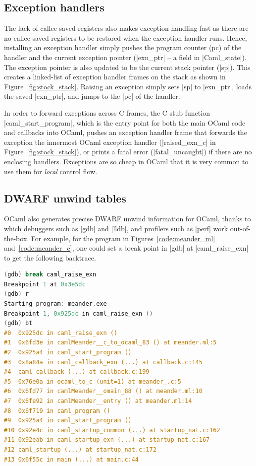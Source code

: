 \documentclass[sigplan,10pt,review,anonymous]{acmart}\settopmatter{printfolios=true,printccs=false,printacmref=false}
\begin{document}
\subsection{Exception handlers}

The lack of callee-saved registers also makes exception handling fast as there
are no callee-saved registers to be restored when the exception handler runs.
Hence, installing an exception handler simply pushes the program counter (pc)
of the handler and the current exception pointer (|exn_ptr| -- a field in
|Caml_state|). The exception pointer is also updated to be the current stack
pointer (|sp|). This creates a linked-list of exception handler frames on the
stack as shown in Figure~\ref{fig:stock_stack}. Raising an exception simply
sets |sp| to |exn_ptr|, loads the saved |exn_ptr|, and jumps to the |pc| of the
handler.

In order to forward exceptions across C frames, the C stub function
|caml_start_program|, which is the entry point for both the main OCaml code and
callbacks into OCaml, pushes an exception handler frame that forwards the
exception the innermost OCaml exception handler (|raised_exn_c| in
Figure~\ref{fig:stock_stack}), or prints a fatal error (|fatal_uncaught|) if
there are no enclosing handlers. Exceptions are so cheap in OCaml that it is
very common to use them for \emph{local} control flow.

\subsection{DWARF unwind tables}

OCaml also generates precise DWARF unwind information for OCaml, thanks to
which debuggers such as |gdb| and |lldb|, and profilers such as |perf| work
out-of-the-box. For example, for the program in Figures~\ref{code:meander_ml}
and~\ref{code:meander_c}, one could set a break point in |gdb| at
|caml_raise_exn| to get the following backtrace.

\begin{lstlisting}[language=c,basicstyle=\ttfamily\footnotesize]
% gdb ./meander.exe
(gdb) break caml_raise_exn
Breakpoint 1 at 0x3e5dc
(gdb) r
Starting program: meander.exe
Breakpoint 1, 0x925dc in caml_raise_exn ()
(gdb) bt
#0  0x925dc in caml_raise_exn ()
#1  0x6fd3e in camlMeander__c_to_ocaml_83 () at meander.ml:5
#2  0x925a4 in caml_start_program ()
#3  0x8a84a in caml_callback_exn (...) at callback.c:145
#4  caml_callback (...) at callback.c:199
#5  0x76e0a in ocaml_to_c (unit=1) at meander_.c:5
#6  0x6fd77 in camlMeander__omain_88 () at meander.ml:10
#7  0x6fe92 in camlMeander__entry () at meander.ml:14
#8  0x6f719 in caml_program ()
#9  0x925a4 in caml_start_program ()
#10 0x92e4c in caml_startup_common (...) at startup_nat.c:162
#11 0x92eab in caml_startup_exn (...) at startup_nat.c:167
#12 caml_startup (...) at startup_nat.c:172
#13 0x6f55c in main (...) at main.c:44
\end{lstlisting}
\end{document}
